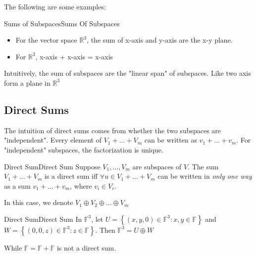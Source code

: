 \documentclass[../main.tex]{subfiles}
\begin{document}
The following are some examples:
\begin{example}{Sums of Subspaces}{Sums Of Subspaces}
\begin{itemize}
\item For the vector space $\mathbb{R}^3$, the sum of x-axis and y-axis are the x-y plane.
\item For  $\mathbb{R}^3$, x-axis + x-axis = x-axis
\end{itemize}
\end{example}
\begin{remark}
Intuitively, the sum of subspaces are the "linear span" of subspaces. Like two axis form a plane in $\mathbb{R}^3$
\end{remark}

\subsection{Direct Sums}
The intuition of direct sums comes from whether the two subspaces are "independent". Every element of $V_1+\ldots +V_m$ can be written as $v_1+\ldots +v_m$. For "independent" subspaces, the factorization is unique.
\begin{definition}{Direct Sum}{Direct Sum}
Suppose $V_1, \ldots ,V_m$ are subspaces of $V$. The sum $V_1+\ldots +V_m$ is a direct sum iff $\forall u \in V_1+\ldots +V_m$ can be written in \emph{only one way} as a sum $v_1+\ldots +v_m$, where $v_i \in V_i$. 

In this case, we denote $V_1 \oplus V_2 \oplus \ldots \oplus V_m$
\end{definition}

\begin{example}{Direct Sum}{Direct Sum}
In $\mathbb{F}^3$, let $U = \left\{ (x,y,0) \in \mathbb{F}^3 : x,y \in \mathbb{F} \right\}$ and  $W=\left\{ (0,0,z)\in \mathbb{F}^3:z \in \mathbb{F} \right\}$. Then $\mathbb{F}^3 = U \oplus W$

While $\mathbb{F}=\mathbb{F} + \mathbb{F}$ is not a direct sum.
\end{example}
\end{document}
